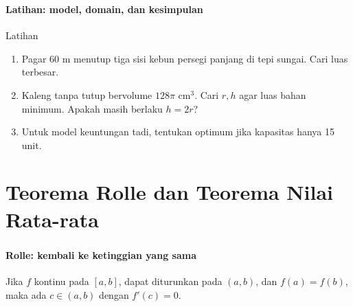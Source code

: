 \documentclass{../../kalkulus-ppt}
\begin{document}
\begin{frame}
\frametitle{\insertsection}
\framesubtitle{Latihan: model, domain, dan kesimpulan}

\begin{exampleblock}{Latihan}\begin{enumerate}
\item Pagar 60 m menutup tiga sisi kebun persegi panjang di tepi sungai. Cari luas terbesar.
\item Kaleng tanpa tutup bervolume $128\pi$ cm$^3$. Cari $r,h$ agar luas bahan minimum. Apakah masih berlaku $h=2r$?
\item Untuk model keuntungan tadi, tentukan optimum jika kapasitas hanya 15 unit.
\end{enumerate}\end{exampleblock}
\end{frame}

\section{Teorema Rolle dan Teorema Nilai Rata-rata}

\begin{frame}
\frametitle{\insertsection}
\framesubtitle{Rolle: kembali ke ketinggian yang sama}

\begin{teorema}[Rolle]
Jika $f$ kontinu pada $[a,b]$, dapat diturunkan pada $(a,b)$, dan $f(a)=f(b)$, maka ada $c\in(a,b)$ dengan $f'(c)=0$.
\end{teorema}
\end{frame}
\end{document}
